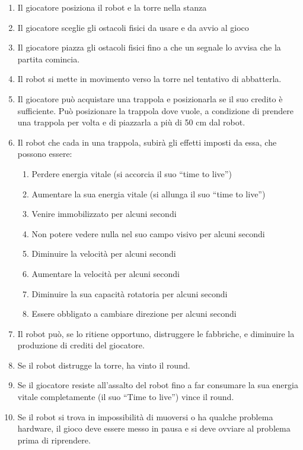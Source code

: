 \begin{enumerate}
    \item Il giocatore posiziona il robot e la torre nella stanza
	\item Il giocatore sceglie gli ostacoli fisici da usare e da avvio al gioco
	\item Il giocatore piazza gli ostacoli fisici fino a che un segnale lo avvisa che la partita comincia.
	\item Il robot si mette in movimento verso la torre nel tentativo di abbatterla.
	\item Il giocatore può acquistare una trappola e posizionarla se il suo credito è sufficiente. Può posizionare la trappola dove vuole, a condizione di prendere una trappola per volta e di piazzarla a più di 50 cm dal robot.
	\item Il robot che cada in una trappola, subirà gli effetti imposti da essa, che possono essere:
		\begin{enumerate}
		\item Perdere energia vitale (si accorcia il suo “time to live”)
		\item Aumentare la sua energia vitale (si allunga il suo “time to live”)
		\item Venire immobilizzato per alcuni secondi
		\item Non potere vedere nulla nel suo campo visivo per alcuni secondi
		\item Diminuire la velocità per alcuni secondi
		\item Aumentare la velocità per alcuni secondi
		\item Diminuire la sua capacità rotatoria per alcuni secondi
		\item Essere obbligato a cambiare direzione per alcuni secondi
		\end{enumerate}
	\item Il robot può, se lo ritiene opportuno, distruggere le fabbriche, e diminuire la produzione di crediti del giocatore.
	\item Se il robot distrugge la torre, ha vinto il round.
	\item Se il giocatore resiste all’assalto del robot fino a far consumare la sua energia vitale completamente (il suo “Time to live”) vince il round.
	\item Se il robot si trova in impossibilità di muoversi o ha qualche problema hardware, il gioco deve essere messo in pausa e si deve ovviare al problema prima di riprendere.
	\end{enumerate}

